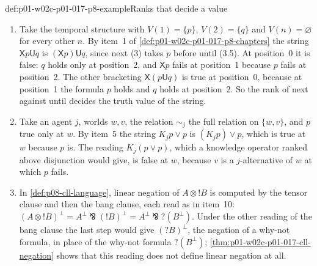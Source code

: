 \begin{hbexample}{def:p01-w02c-p01-017-p8-example}{Ranks that decide a value}
\begin{enumerate}
\item Take the temporal structure with \(V(1)=\{p\}\), \(V(2)=\{q\}\) and
  \(V(n)=\varnothing\) for every other \(n\).  By item~1 of
  \cref{def:p01-w02c-p01-017-p8-chapters} the string
  \(\mathsf Xp\mathbin{\mathsf U}q\) is
  \((\mathsf Xp)\mathbin{\mathsf U}q\), since next (3) takes \(p\) before
  until (3.5).  At position~0 it is false: \(q\) holds only at
  position~2, and \(\mathsf Xp\) fails at position~1 because \(p\) fails
  at position~2.  The other bracketing
  \(\mathsf X(p\mathbin{\mathsf U}q)\) is true at position~0, because at
  position~1 the formula \(p\) holds and \(q\) holds at position~2.  So
  the rank of next against until decides the truth value of the string.
\item Take an agent \(j\), worlds \(w,v\), the relation \(\sim_j\) the
  full relation on \(\{w,v\}\), and \(p\) true only at \(w\).  By item~5
  the string \(K_jp\lor p\) is \((K_jp)\lor p\), which is true at \(w\)
  because \(p\) is.  The reading \(K_j(p\lor p)\), which a knowledge
  operator ranked above disjunction would give, is false at \(w\),
  because \(v\) is a \(j\)-alternative of \(w\) at which \(p\) fails.
\item In \cref{def:p08-cll-language}, linear negation of
  \(A\otimes!B\) is computed by the tensor clause and then the bang
  clause, each read as in item~10:
  \((A\otimes!B)^\perp=A^\perp\bindnasrepma(!B)^\perp
  =A^\perp\bindnasrepma?(B^\perp)\).  Under the other reading of the bang
  clause the last step would give \((?B)^\perp\), the negation of a
  why-not formula, in place of the why-not formula \(?(B^\perp)\);
  \cref{thm:p01-w02c-p01-017-cll-negation} shows that this reading does
  not define linear negation at all.
\end{enumerate}
\end{hbexample}

